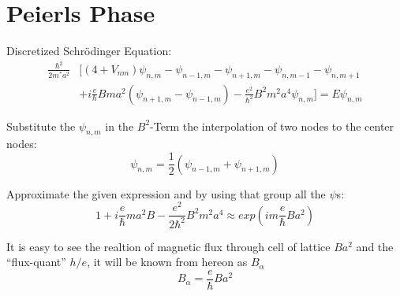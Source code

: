 
\author{Jonas Siegl}



\section{Peierls Phase}
Discretized Schr\"odinger Equation:
\begin{align}
	\frac{\hbar^2}{2m^*a^2} &[(4 +V_{nm}) \psi_{n,m} - \psi_{n-1,m} - \psi_{n+1,m} - \psi_{n,m-1} - \psi_{n,m+1} \nonumber \\
	&+i \frac{e}{\hbar} B m a^2 (\psi_{n+1,m} - \psi_{n-1,m}) - \frac{e^2}{\hbar^2} B^2 m^2 a^4 \psi_{n,m} ] = E \psi_{n,m}
\end{align}

Substitute the $\psi_{n,m}$ in the $B^2$-Term the interpolation of two nodes to the center nodes:
\begin{equation}
	\psi_{n,m} = \frac{1}{2} (\psi_{n-1,m} + \psi_{n+1,m})
	\label{interpolate_psi}
\end{equation}

Approximate the given expression and by using that group all the $\psi$s:
\begin{equation}
	1 + i \frac{e}{\hbar} m a^2 B - \frac{e^2}{2 \hbar^2} B^2 m^2 a^4 \approx exp(i m \frac{e}{\hbar} B a^2)
	\label{approx_exp}
\end{equation}

It is easy to see the realtion of magnetic flux through cell of lattice $Ba^2$ and the ``flux-quant'' $h / e$, 
it will be known from hereon as $B_{\alpha}$
\begin{equation}
	B_{\alpha} = \frac{e}{\hbar} B  a^2
	\label{Balpha}
\end{equation}

